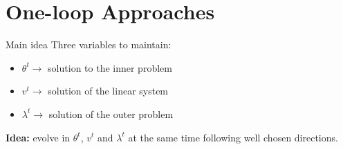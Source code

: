 \documentclass{beamer}
\newcommand{\citeline}[1]{\textcolor{gray}{\small[{\color{linkcolor} #1}]}}
\begin{document}



\section{One-loop Approaches}






\begin{frame}{Main idea}
    Three variables to maintain:
    \begin{itemize}
        \item $\theta^t\rightarrow$ solution to the inner problem
        \item $v^t\rightarrow$ solution of the linear system
        \item $\lambda^t\rightarrow$ solution of the outer problem
    \end{itemize}

    \vspace{.5cm}
    \textbf{Idea:} evolve in $\theta^t$, $v^t$ and $\lambda^t$ at the same time following well chosen directions.
\end{frame}
\end{document}
